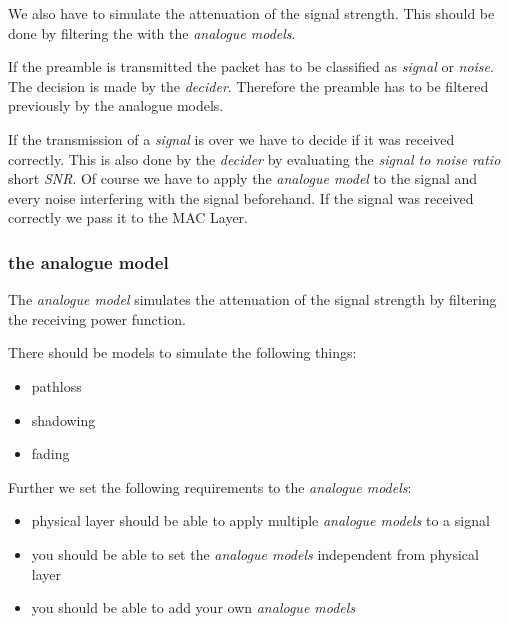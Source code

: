We also have to simulate the attenuation of the signal strength. This should be done by filtering the with the \textit{analogue models}.

If the preamble is transmitted the packet has to be classified as \textit{signal} or \textit{noise}. The decision is made by the \textit{decider}. Therefore the preamble has to be filtered previously by the analogue models.

If the transmission of a \textit{signal} is over we have to decide if it was received correctly. This is also done by the \textit{decider} by evaluating the \textit{signal to noise ratio} short \textit{SNR}. Of course we have to apply the \textit{analogue model} to the signal and every noise interfering with the signal beforehand. If the signal was received correctly we pass it to the MAC Layer.

\subsubsection{the analogue model}

The \textit{analogue model} simulates the attenuation of the signal strength by filtering the receiving power function.

There should be models to simulate the following things:

\begin{itemize}
 \item pathloss
 \item shadowing
 \item fading
\end{itemize}

Further we set the following requirements to the \textit{analogue models}:

\begin{itemize}
 \item physical layer should be able to apply multiple \textit{analogue models} to a signal
 \item you should be able to set the \textit{analogue models} independent from physical layer
 \item you should be able to add your own \textit{analogue models}
\end{itemize}

